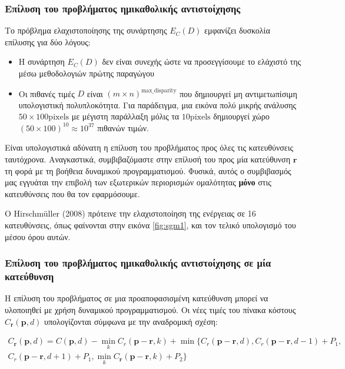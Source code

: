 \subsubsection{Επίλυση του προβλήματος ημικαθολικής αντιστοίχησης}

Το πρόβλημα ελαχιστοποίησης της συνάρτησης $E_C(D)$ εμφανίζει δυσκολία επίλυσης για δύο λόγους:
\begin{itemize}
	\item Η συνάρτηση $E_C(D)$ δεν είναι συνεχής ώστε να προσεγγίσουμε το ελάχιστό της μέσω μεθοδολογιών πρώτης παραγώγου 
	\item Οι πιθανές τιμές $D$ είναι \e $(m \times n)^{\text{max\_disparity}}$ \g που δημιουργεί μη αντιμετωπίσιμη υπολογιστική πολυπλοκότητα. Για παράδειγμα, μια εικόνα πολύ μικρής ανάλυσης \e $50\times100 \text{pixels}$ \g με μέγιστη παράλλαξη μόλις τα \e $10 \text{pixels}$ \g δημιουργεί χώρο $(50 \times 100)^{10} \approx 10^{37}$ πιθανών τιμών.
\end{itemize}

\g
Είναι υπολογιστικά αδύνατη η επίλυση του προβλήματος προς όλες τις κατευθύνσεις ταυτόχρονα. Αναγκαστικά, συμβιβαζόμαστε στην επίλυσή του προς μία κατεύθυνση $\mathbf{r}$ τη φορά με τη βοήθεια δυναμικού προγραμματισμού. Φυσικά, αυτός ο συμβιβασμός μας εγγυάται την επιβολή των εξωτερικών περιορισμών ομαλότητας \textbf{μόνο} στις κατευθύνσεις που θα τον εφαρμόσουμε. 

Ο \e Hirschmüller (2008) \g \citep{hirschmuller2008stereo} πρότεινε την ελαχιστοποίηση της ενέργειας σε 16 κατευθύνσεις, όπως φαίνονται στην εικόνα \ref{fig:sgm1}, και τον τελικό υπολογισμό του μέσου όρου αυτών.

\subsubsection{Επίλυση του προβλήματος ημικαθολικής αντιστοίχησης σε μία κατεύθυνση}

Η επίλυση του προβλήματος σε μια προαποφασισμένη κατεύθυνση μπορεί να υλοποιηθεί με χρήση δυναμικού προγραμματισμού. Οι νέες τιμές του πίνακα κόστους $C_{\mathbf{r}}(\mathbf{p}, d)$ υπολογίζονται σύμφωνα με την αναδρομική σχέση:

\begin{multline*} \label{sgm_recursive} C_{\mathbf{r}}(\mathbf{p}, d) = C(\mathbf{p},
d) - \min_k C_r(\mathbf{p} - \mathbf{r}, k) + \min\biggl\{ C_r(\mathbf{p} -
\mathbf{r}, d), C_r(\mathbf{p} - \mathbf{r}, d - 1) + P_1,\\ C_r(\mathbf{p} -
\mathbf{r}, d + 1) + P_1, \min_k C_{\mathbf{r}}(\mathbf{p} - \mathbf{r}, k) +
P_2 \biggr\}  \end{multline*}

